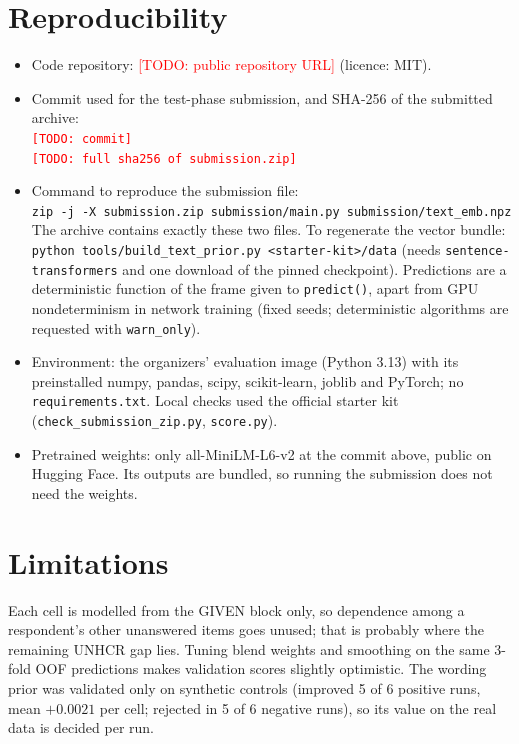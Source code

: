 \documentclass{article}
\newcommand{\todo}[1]{\textcolor{red}{[TODO: #1]}}
\newcommand{\coderepo}{\todo{public repository URL}}
\newcommand{\codecommit}{\todo{commit}}
\newcommand{\zipsha}{\todo{full sha256 of submission.zip}}
\begin{document}
\section{Reproducibility}
\label{sec:repro}

\begin{itemize}[leftmargin=*]
  \item Code repository: \coderepo{} (licence: MIT).
  \item Commit used for the test-phase submission, and SHA-256 of the submitted archive:\\
    {\footnotesize\texttt{\codecommit}}\\
    {\footnotesize\texttt{\zipsha}}
  \item Command to reproduce the submission file:\\
    {\footnotesize\texttt{zip -j -X submission.zip submission/main.py submission/text\_emb.npz}}\\
    The archive contains exactly these two files. To regenerate the vector bundle: \texttt{python tools/build\_text\_prior.py <starter-kit>/data} (needs \texttt{sentence-transformers} and one download of the pinned checkpoint). Predictions are a deterministic function of the frame given to \texttt{predict()}, apart from GPU nondeterminism in network training (fixed seeds; deterministic algorithms are requested with \texttt{warn\_only}).
  \item Environment: the organizers' evaluation image (Python 3.13) with its preinstalled numpy, pandas, scipy, scikit-learn, joblib and PyTorch; no \texttt{requirements.txt}. Local checks used the official starter kit (\texttt{check\_submission\_zip.py}, \texttt{score.py}).
  \item Pretrained weights: only all-MiniLM-L6-v2 at the commit above, public on Hugging Face. Its outputs are bundled, so running the submission does not need the weights.
\end{itemize}

\section{Limitations}
\label{sec:limitations}

Each cell is modelled from the GIVEN block only, so dependence among a respondent's other unanswered items goes unused; that is probably where the remaining UNHCR gap lies. Tuning blend weights and smoothing on the same 3-fold OOF predictions makes validation scores slightly optimistic. The wording prior was validated only on synthetic controls (improved 5 of 6 positive runs, mean $+0.0021$ per cell; rejected in 5 of 6 negative runs), so its value on the real data is decided per run.
\end{document}
